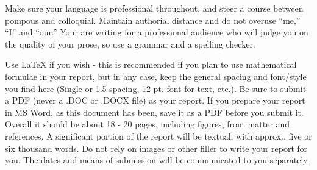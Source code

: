 Make sure your language is professional throughout, and steer a course between pompous and colloquial. Maintain
authorial distance and do not overuse “me,” “I” and “our.” Your are writing for a professional audience who will
judge you on the quality of your prose, so use a grammar and a spelling checker.

Use LaTeX if you wish - this is recommended if you plan to use mathematical formulae in your report, but in any
case, keep the general spacing and font/style you find here (Single or 1.5 spacing, 12 pt. font for text, etc.).
Be sure to submit a PDF (never a .DOC or .DOCX file) as your report. If you prepare your report in MS Word, as
this document has been, save it as a PDF before you submit it. Overall it should be about 18 - 20 pages, including
figures, front matter and references, A significant portion of the report will be textual, with approx.. five or
six thousand words. Do not rely on images or other filler to write your report for you.
The dates and means of submission will be communicated to you separately.
